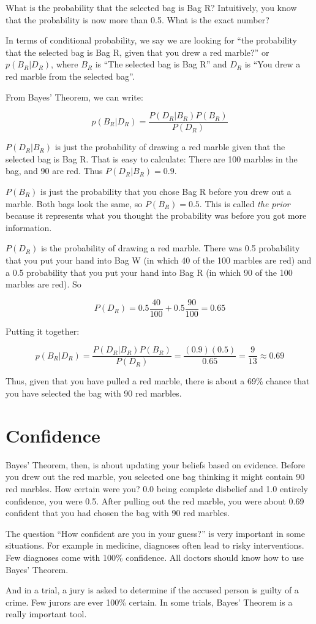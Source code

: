 What is the probability that the selected bag is Bag R? Intuitively,
you know that the probability is now more than 0.5. What is the exact
number?

In terms of conditional probability, we say we are looking for ``the probability
that the selected bag is Bag R, given that you drew a red marble?'' or
$p(B_R | D_R)$, where $B_R$ is ``The selected bag is Bag R'' and $D_R$ is
``You drew a red marble from the selected bag''.

From Bayes' Theorem, we can write:

$$p(B_R | D_R) = \frac{ P(D_R | B_R) P(B_R) } {P(D_R)}$$

$P(D_R | B_R)$ is just the probability of drawing a red marble given that the
selected bag is Bag R. That is easy to calculate: There are 100
marbles in the bag, and 90 are red. Thus $P(D_R | B_R) = 0.9$.

$P(B_R)$ is just the probability that you chose Bag R before you drew
out a marble. Both bags look the same, so $P(B_R)= 0.5$. This is
called \textit{the prior} because it represents what you thought the
probability was before you got more information.

$P(D_R)$ is the probability of drawing a red marble. There was 0.5
probability that you put your hand into Bag W (in which 40 of the 100
marbles are red) and a 0.5 probability that you put your hand into Bag
R (in which 90 of the 100 marbles are red).  So

$$P(D_R) = 0.5 \frac{40}{100} + 0.5 \frac{90}{100} = 0.65$$

Putting it together:

$$p(B_R | D_R) = \frac{ P(D_R | B_R) P(B_R) } {P(D_R)} = \frac{(0.9)(0.5)}{0.65} = \frac{9}{13} \approx 0.69$$

Thus, given that you have pulled a red marble, there is about a 69\% chance
that you have selected the bag with 90 red marbles.

\section{Confidence}

Bayes' Theorem, then, is about updating your beliefs based on
evidence.  Before you drew out the red marble, you selected one bag
thinking it might contain 90 red marbles. How certain were you? 0.0 being complete disbelief and 1.0 entirely
confidence, you were 0.5. After pulling out the red marble, you were about 0.69
confident that you had chosen the bag with 90 red marbles.

The question ``How confident are you in your guess?'' is very
important in some situations. For example in medicine, diagnoses often
lead to risky interventions. Few diagnoses come with 100\% confidence.
All doctors should know how to use Bayes' Theorem. 

And in a trial, a jury is asked to determine if the accused person is
guilty of a crime. Few jurors are ever 100\% certain. In some trials, Bayes'
Theorem is a really important tool.

